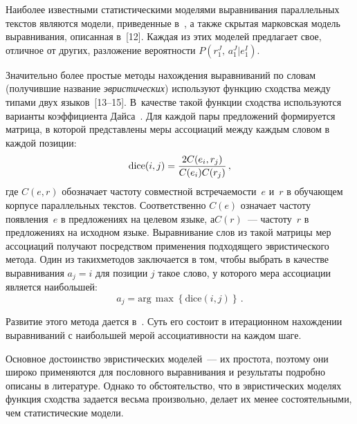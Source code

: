 \begin{multicols}{2}
      Наиболее известными статистическими моделями выравнивания 
параллельных текстов являются модели, приведенные в~\cite{1koz, 2koz, 
10koz}, а также скрытая марковская модель выравнивания, описанная в~[12]. 
Каждая из этих моделей предлагает свое, отличное от других, разложение 
вероятности $P(r_1^J,\,a_1^J\vert e_1^I)$.
      
      Значительно более простые методы нахождения выравниваний по 
словам (получившие название \textit{эвристических}) используют функцию 
сходства между типами двух языков~[13--15]. В~качестве 
такой функции сходства используются варианты коэффициента 
Дайса~\cite{16koz}. Для каждой пары предложений формируется матрица, в 
которой пред\-став\-ле\-ны меры ассоциаций между каждым словом в каждой 
позиции:
      \begin{equation*}
      \mathrm{dice}(i,j) = \displaystyle\frac{\displaystyle 2C(e_i,r_j)\mathstrut}{\displaystyle C(e_i) C(r_j)\mathstrut}\,,
      \end{equation*}
где $C(e,r)$ обозначает частоту совместной встречаемости~$e$ и~$r$ в 
обучающем корпусе параллельных текстов. Соответственно $C(e)$ означает 
частоту появления~$e$ в предложениях на целевом языке, а\linebreak $C(r)$~--- 
частоту~$r$ в предложениях на исходном языке. Выравнивание слов из такой 
матрицы мер ассоциаций получают посредством применения подходящего 
эвристического метода. Один из таких\linebreak методов заключается в том, чтобы 
выбрать в качестве выравнивания $a_j=i$ для позиции $j$ такое слово, у 
которого мера ассоциации является наибольшей:
\begin{equation*}
a_j=\mathrm{arg}\,\max\left \{\mathrm{dice}(i,j)\right \}\,.
\end{equation*}
     
     Развитие этого метода дается в~\cite{15koz}. Суть его состоит в 
итерационном нахождении выравниваний с наибольшей мерой 
ассоциативности на каждом шаге.
     
     Основное достоинство эвристических моделей~--- их простота, 
поэтому они широко применяются для пословного выравнивания и 
результаты подробно описаны в литературе. Однако то обстоятельство, что в 
эвристических моделях функция сходства задается весьма произвольно, 
делает их менее состоятельными, чем статистические модели.
     

\end{multicols}
